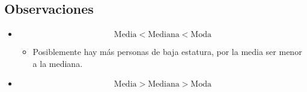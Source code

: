 \subsection{Observaciones}
\begin{itemize}
    \item \[
      \text{Media} < \text{Mediana} < \text{Moda}  
    \]
        \begin{itemize}
            \item Posiblemente hay más personas de baja estatura, por la media ser menor a la mediana.
        \end{itemize}
    
    \item \[
        \text{Media} > \text{Mediana} > \text{Moda}  
    \]
\end{itemize}
